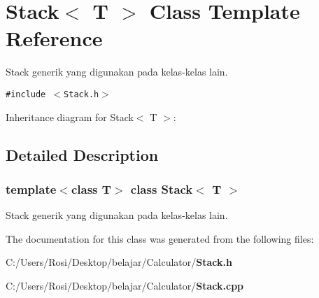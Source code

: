 \section{Stack$<$ T $>$ Class Template Reference}
\label{class_stack}
Stack generik yang digunakan pada kelas-kelas lain.  


{\tt \#include $<$Stack.h$>$}

Inheritance diagram for Stack$<$ T $>$:

\subsection{Detailed Description}
\subsubsection*{template$<$class T$>$ class Stack$<$ T $>$}

Stack generik yang digunakan pada kelas-kelas lain. 



The documentation for this class was generated from the following files:\begin{CompactItemize}
\item 
C:/Users/Rosi/Desktop/belajar/Calculator/{\bf Stack.h}\item 
C:/Users/Rosi/Desktop/belajar/Calculator/{\bf Stack.cpp}\end{CompactItemize}
